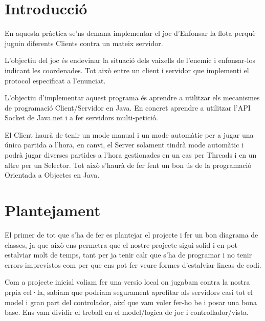 \section*{Introducció}
En aquesta pràctica se'ns demana implementar el joc d'Enfonsar la flota perquè juguin diferents Clients contra un mateix servidor.

L'objectiu del joc és endevinar la situació dels vaixells de l'enemic i enfonsar-los indicant les coordenades. Tot això entre un client i servidor que implementi el protocol especificat a l'enunciat.

L'objectiu d'implementar aquest programa és aprendre a utilitzar els mecanismes de programació Client/Servidor en Java. En concret aprendre a utilitzar l'API Socket de Java.net i a fer servidors multi-petició.

El Client haurà de tenir un mode manual i un mode automàtic per a jugar una única partida a l'hora, en canvi, el Server solament tindrà mode automàtic i podrà jugar diverses partides a l'hora gestionades en un cas per Threads i en un altre per un Selector.
Tot això s'haurà de fer fent un bon ús de la programació Orientada a Objectes en Java.

\newpage
\section*{Plantejament}
El primer de tot que s'ha de fer es plantejar el projecte i fer un bon diagrama de classes, ja que això ens permetra que el nostre projecte sigui solid i en pot estalviar molt de temps, tant per ja tenir calr que s'ha de programar i no tenir errors imprevistos com per que ens pot fer veure formes d'estalviar lineas de codi. 


Com a projecte inicial voliam fer una versio local on jugabam contra la nostra prpia cel·la, sabiam que podriam segurament aprofitar als servidors casi tot el model i gran part del controlador, així que vam voler fer-ho be i posar una bona base.
Ens vam dividir el treball en el model/logica de joc i controllador/vista. 
\newpage
